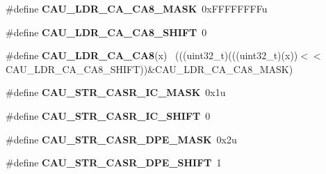\begin{DoxyCompactItemize}
\item 
\hypertarget{group___c_a_u___register___masks_ga85639a056055e9b13bd051f13fa061f8}{}\#define {\bfseries C\+A\+U\+\_\+\+L\+D\+R\+\_\+\+C\+A\+\_\+\+C\+A8\+\_\+\+M\+A\+S\+K}~0x\+F\+F\+F\+F\+F\+F\+F\+Fu\label{group___c_a_u___register___masks_ga85639a056055e9b13bd051f13fa061f8}

\item 
\hypertarget{group___c_a_u___register___masks_ga41f527c7bdb6b4b5502baa4d4dc79cbc}{}\#define {\bfseries C\+A\+U\+\_\+\+L\+D\+R\+\_\+\+C\+A\+\_\+\+C\+A8\+\_\+\+S\+H\+I\+F\+T}~0\label{group___c_a_u___register___masks_ga41f527c7bdb6b4b5502baa4d4dc79cbc}

\item 
\hypertarget{group___c_a_u___register___masks_ga03ec4dc2395d8281c500bad63e486593}{}\#define {\bfseries C\+A\+U\+\_\+\+L\+D\+R\+\_\+\+C\+A\+\_\+\+C\+A8}(x)                                            ~(((uint32\+\_\+t)(((uint32\+\_\+t)(x))$<$$<$C\+A\+U\+\_\+\+L\+D\+R\+\_\+\+C\+A\+\_\+\+C\+A8\+\_\+\+S\+H\+I\+F\+T))\&C\+A\+U\+\_\+\+L\+D\+R\+\_\+\+C\+A\+\_\+\+C\+A8\+\_\+\+M\+A\+S\+K)\label{group___c_a_u___register___masks_ga03ec4dc2395d8281c500bad63e486593}

\item 
\hypertarget{group___c_a_u___register___masks_ga8dffcd6d4b1c0445b861214d9fcb2bbd}{}\#define {\bfseries C\+A\+U\+\_\+\+S\+T\+R\+\_\+\+C\+A\+S\+R\+\_\+\+I\+C\+\_\+\+M\+A\+S\+K}~0x1u\label{group___c_a_u___register___masks_ga8dffcd6d4b1c0445b861214d9fcb2bbd}

\item 
\hypertarget{group___c_a_u___register___masks_ga6c5490b9ee06c378d9e52f5dcc4e4da6}{}\#define {\bfseries C\+A\+U\+\_\+\+S\+T\+R\+\_\+\+C\+A\+S\+R\+\_\+\+I\+C\+\_\+\+S\+H\+I\+F\+T}~0\label{group___c_a_u___register___masks_ga6c5490b9ee06c378d9e52f5dcc4e4da6}

\item 
\hypertarget{group___c_a_u___register___masks_ga44bc22302cf006a4b12f130de2f509ab}{}\#define {\bfseries C\+A\+U\+\_\+\+S\+T\+R\+\_\+\+C\+A\+S\+R\+\_\+\+D\+P\+E\+\_\+\+M\+A\+S\+K}~0x2u\label{group___c_a_u___register___masks_ga44bc22302cf006a4b12f130de2f509ab}

\item 
\hypertarget{group___c_a_u___register___masks_gade64f9ddd7c12103c652b284f192d6ea}{}\#define {\bfseries C\+A\+U\+\_\+\+S\+T\+R\+\_\+\+C\+A\+S\+R\+\_\+\+D\+P\+E\+\_\+\+S\+H\+I\+F\+T}~1\label{group___c_a_u___register___masks_gade64f9ddd7c12103c652b284f192d6ea}


\end{DoxyCompactItemize}
